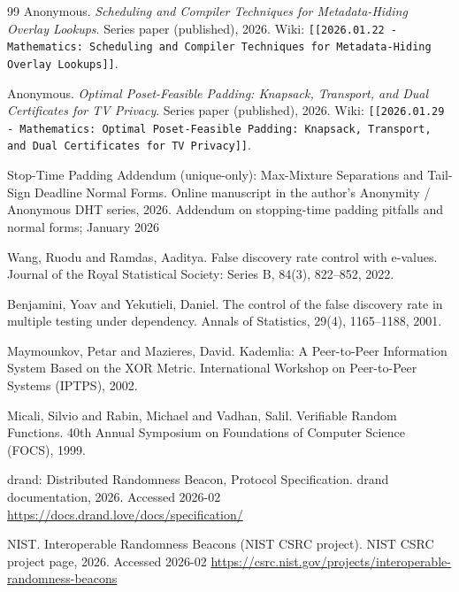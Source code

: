 \documentclass[11pt]{article}
\begin{document}
\begin{thebibliography}{99}
Anonymous.
\newblock \emph{Scheduling and Compiler Techniques for Metadata-Hiding Overlay Lookups}.
\newblock Series paper (published), 2026.
\newblock Wiki: \texttt{[[2026.01.22 - Mathematics: Scheduling and Compiler Techniques for Metadata-Hiding Overlay Lookups]]}.

Anonymous.
\newblock \emph{Optimal Poset-Feasible Padding: Knapsack, Transport, and Dual Certificates for TV Privacy}.
\newblock Series paper (published), 2026.
\newblock Wiki: \texttt{[[2026.01.29 - Mathematics: Optimal Poset-Feasible Padding: Knapsack, Transport, and Dual Certificates for TV Privacy]]}.

\newblock Stop-Time Padding Addendum (unique-only): Max-Mixture Separations and Tail-Sign Deadline Normal Forms.
\newblock Online manuscript in the author's Anonymity / Anonymous DHT series, 2026.
\newblock Addendum on stopping-time padding pitfalls and normal forms; January 2026

Wang, Ruodu and Ramdas, Aaditya.
\newblock False discovery rate control with e-values.
\newblock Journal of the Royal Statistical Society: Series B, 84(3), 822--852, 2022.

Benjamini, Yoav and Yekutieli, Daniel.
\newblock The control of the false discovery rate in multiple testing under dependency.
\newblock Annals of Statistics, 29(4), 1165--1188, 2001.

Maymounkov, Petar and Mazieres, David.
\newblock Kademlia: A Peer-to-Peer Information System Based on the XOR Metric.
\newblock International Workshop on Peer-to-Peer Systems (IPTPS), 2002.

Micali, Silvio and Rabin, Michael and Vadhan, Salil.
\newblock Verifiable Random Functions.
\newblock 40th Annual Symposium on Foundations of Computer Science (FOCS), 1999.

\newblock drand: Distributed Randomness Beacon, Protocol Specification.
\newblock drand documentation, 2026.
\newblock Accessed 2026-02
\newblock \url{https://docs.drand.love/docs/specification/}

{NIST}.
\newblock Interoperable Randomness Beacons (NIST CSRC project).
\newblock NIST CSRC project page, 2026.
\newblock Accessed 2026-02
\newblock \url{https://csrc.nist.gov/projects/interoperable-randomness-beacons}


\end{thebibliography}
\end{document}
